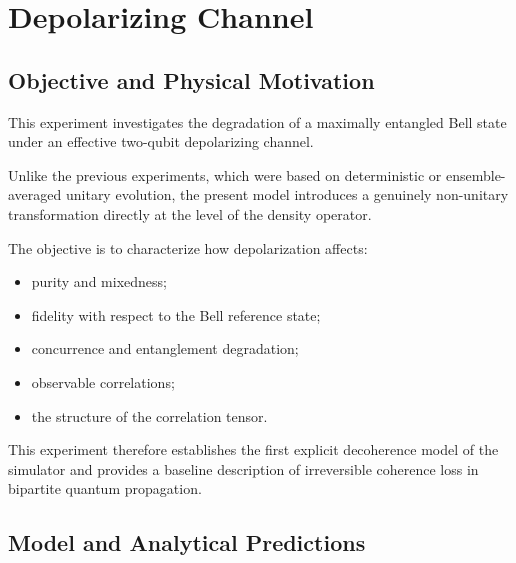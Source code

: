 
\section{Depolarizing Channel}
\label{sec:depolarizing_channel}


\subsection{Objective and Physical Motivation}

This experiment investigates the degradation of a maximally entangled Bell state under an effective two-qubit depolarizing channel.

Unlike the previous experiments, which were based on deterministic or ensemble-averaged unitary evolution, the present model introduces a genuinely non-unitary transformation directly at the level of the density operator.

The objective is to characterize how depolarization affects:

\begin{itemize}
    \item purity and mixedness;
    \item fidelity with respect to the Bell reference state;
    \item concurrence and entanglement degradation;
    \item observable correlations;
    \item the structure of the correlation tensor.
\end{itemize}

This experiment therefore establishes the first explicit decoherence model of the simulator and provides a baseline description of irreversible coherence loss in bipartite quantum propagation.


\subsection{Model and Analytical Predictions}


